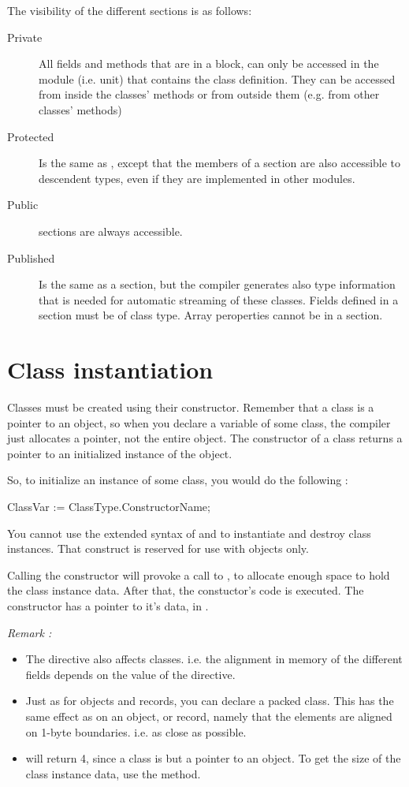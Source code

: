 \documentclass{report}
\begin{document}
The visibility of the different sections is as follows:
\begin{description}
\item [Private\ ] All fields and methods that are in a  block, can 
only be accessed in the module (i.e. unit) that contains the class definition.
They can be accessed from inside the classes' methods or from outside them
(e.g. from other classes' methods)
\item [Protected\ ] Is the same as , except that the members of
a  section are also accessible to descendent types, even if
they are implemented in other modules.
\item [Public\ ] sections are always accessible.
\item [Published\ ] Is the same as a  section, but the compiler
generates also type information that is needed for automatic streaming of
these classes. Fields defined in a  section must be of class type.
Array peroperties cannot be in a  section.
\end{description}

\section{Class instantiation}

Classes must be created using their constructor. Remember that a class is a
pointer to an object, so when you declare a variable of some class, the
compiler just allocates a pointer, not the entire object. The constructor of
a class returns a pointer to an initialized instance of the object.

So, to initialize an instance of some class, you would do the following :
\begin{listing}
  ClassVar := ClassType.ConstructorName;
\end{listing}
You cannot use the extended syntax of  and  to
instantiate and destroy class instances. 
That construct is reserved for use with objects only.

Calling the constructor will provoke a call to , to allocate
enough space to hold the class instance data. 
After that, the constuctor's code is executed. 
The constructor has a pointer to it's data, in .

{\em Remark :}
\begin{itemize}
\item The  directive also affects classes.
i.e. the alignment in memory of the different fields depends on the
value of  the  directive.
\item Just as for objects and records, you can declare a packed class.
This has the same effect as on an object, or record, namely that the
elements are aligned on 1-byte boundaries. i.e. as close as possible.
\item {} will return 4, since a class is but a pointer to
an object. To get the size of the class instance data, use the 
 method.
\end{itemize}
\end{document}
